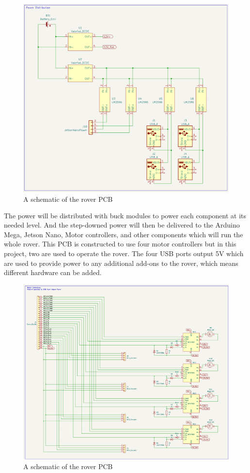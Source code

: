 \documentclass[a4paper, 10pt]{article}
\begin{document}
		\begin{figure} [!h]
			\centering
			\includegraphics[scale=0.9]{Photos/Rover schematic 1}
			\caption{A schematic of the rover PCB}
			\label{rover_PCB_1}
		\end{figure}

		The power will be distributed with buck modules to power each component at its needed level. And the step-downed power will then be delivered to the Arduino Mega, Jetson Nano, Motor controllers, and other components which will run the whole rover. This PCB is constructed to use four motor controllers but in this project, two are used to operate the rover. The four USB ports output 5V which are used to provide power to any additional add-ons to the rover, which means different hardware can be added. 
		
		\begin{figure} [!h]
			\centering
			\includegraphics[scale=0.9]{Photos/Rover schematic 2}
			\caption{A schematic of the rover PCB}
			\label{rover_PCB_2}
		\end{figure}
		
\end{document}
